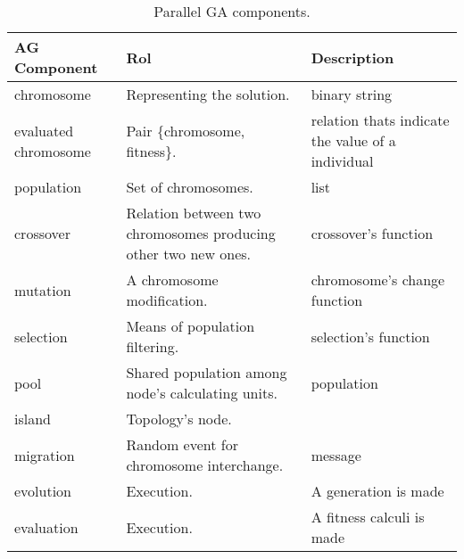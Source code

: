 \begin{table*}\small
  \centering
  \caption{Parallel GA components.}\label{agpComp}
  \begin{tabular}{|>{\centering\arraybackslash}p{3cm}|>{\centering\arraybackslash}p{5cm}|>{\centering\arraybackslash}p{3cm}|}
   \hline
   \textbf{AG Component} & \textbf{Rol} & \textbf{Description} \\
     \hline
      chromosome & Representing the solution. & binary string \\
     \hline
      evaluated chromosome & Pair \{chromosome, fitness\}. & relation thats indicate the value of a individual\\
     \hline
      population & Set of chromosomes. & list \\
     \hline
     crossover & Relation between two chromosomes producing other two new ones. & crossover's function \\
     \hline
      mutation & A chromosome modification. & chromosome's change function \\
     \hline
     selection & Means of population filtering. & selection's function \\
     \hline
      pool & Shared population among node's calculating units. & population \\
     \hline
      island & Topology's node. &  \\
     \hline
      migration & Random event for chromosome interchange. & message \\
     \hline
      evolution & Execution. & A generation is made \\
     \hline
      evaluation & Execution. & A fitness calculi is made \\
     \hline
   \end{tabular}

\end{table*}
